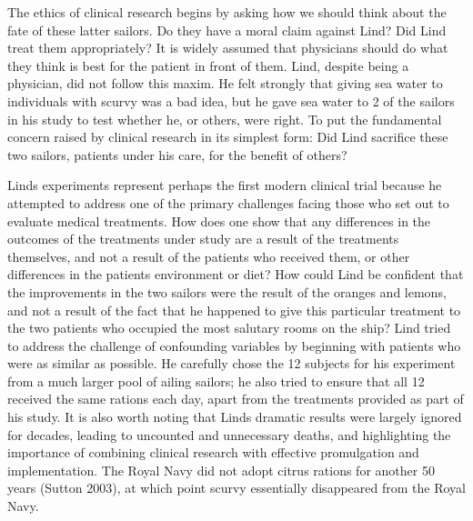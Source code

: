 \documentclass[12p]{article}
\begin{document}
The ethics of clinical research begins by asking how we should think about the fate of these latter sailors. Do they have a moral claim against Lind? Did Lind treat them appropriately? It is widely assumed that physicians should do what they think is best for the patient in front of them. Lind, despite being a physician, did not follow this maxim. He felt strongly that giving sea water to individuals with scurvy was a bad idea, but he gave sea water to 2 of the sailors in his study to test whether he, or others, were right. To put the fundamental concern raised by clinical research in its simplest form: Did Lind sacrifice these two sailors, patients under his care, for the benefit of others?

Linds experiments represent perhaps the first modern clinical trial because he attempted to address one of the primary challenges facing those who set out to evaluate medical treatments. How does one show that any differences in the outcomes of the treatments under study are a result of the treatments themselves, and not a result of the patients who received them, or other differences in the patients environment or diet? How could Lind be confident that the improvements in the two sailors were the result of the oranges and lemons, and not a result of the fact that he happened to give this particular treatment to the two patients who occupied the most salutary rooms on the ship? Lind tried to address the challenge of confounding variables by beginning with patients who were as similar as possible. He carefully chose the 12 subjects for his experiment from a much larger pool of ailing sailors; he also tried to ensure that all 12 received the same rations each day, apart from the treatments provided as part of his study. It is also worth noting that Linds dramatic results were largely ignored for decades, leading to uncounted and unnecessary deaths, and highlighting the importance of combining clinical research with effective promulgation and implementation. The Royal Navy did not adopt citrus rations for another 50 years (Sutton 2003), at which point scurvy essentially disappeared from the Royal Navy.
\end{document}
